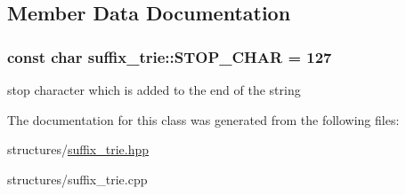 \subsection{Member Data Documentation}
\hypertarget{classsuffix__trie_a65563ea1279d3fc3353a0806f6a07aad}{
\subsubsection[{S\+T\+O\+P\+\_\+\+C\+H\+A\+R}]{\setlength{\rightskip}{0pt plus 5cm}const char suffix\+\_\+trie\+::\+S\+T\+O\+P\+\_\+\+C\+H\+A\+R = 127\hspace{0.3cm}{\ttfamily [static]}}}\label{classsuffix__trie_a65563ea1279d3fc3353a0806f6a07aad}
stop character which is added to the end of the string 

The documentation for this class was generated from the following files\+:\begin{DoxyCompactItemize}
\item 
structures/\hyperlink{suffix__trie_8hpp}{suffix\+\_\+trie.\+hpp}\item 
structures/suffix\+\_\+trie.\+cpp\end{DoxyCompactItemize}
